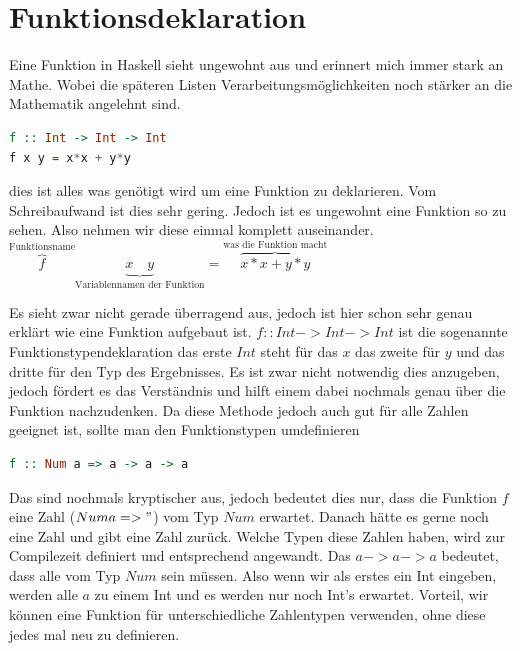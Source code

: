 \section{Funktionsdeklaration}
Eine Funktion in Haskell sieht ungewohnt aus und erinnert mich immer stark an Mathe. Wobei die späteren Listen Verarbeitungsmöglichkeiten noch stärker an die Mathematik angelehnt sind.
\newline
\begin{lstlisting}[language=Haskell]  
f :: Int -> Int -> Int
f x y = x*x + y*y
\end{lstlisting}
\qquad\newline
dies ist alles was genötigt wird um eine Funktion zu deklarieren. Vom Schreibaufwand ist dies sehr gering. Jedoch ist es ungewohnt eine Funktion so zu sehen. Also nehmen wir diese einmal komplett auseinander. 
\qquad\newline\qquad\newline
$\overbrace{f}^\text{Funktionsname} \underbrace{x \quad y}_\text{Variablennamen der Funktion} = \overbrace{x*x+y*y}^\text{was die Funktion macht}$
\qquad\newline\qquad\newline

Es sieht zwar nicht gerade überragend aus, jedoch ist hier schon sehr genau erklärt wie eine Funktion aufgebaut ist. 
$f :: Int -> Int -> Int$ ist die sogenannte Funktionstypendeklaration das erste $Int$ steht für das $x$ das zweite für $y$ und das dritte für den Typ des Ergebnisses. Es ist zwar nicht notwendig dies anzugeben, jedoch fördert es das Verständnis und hilft einem dabei nochmals genau über die Funktion nachzudenken. Da diese Methode jedoch auch gut für alle Zahlen geeignet ist, sollte man den Funktionstypen umdefinieren
\newline
\begin{lstlisting}[language=Haskell]  
f :: Num a => a -> a -> a 
\end{lstlisting}
\qquad\newline
Das sind nochmals kryptischer aus, jedoch bedeutet dies nur, dass die Funktion $f$ eine Zahl ($Num a =>"$) vom Typ $Num$ erwartet. Danach hätte es gerne noch eine Zahl und gibt eine Zahl zurück. Welche Typen diese Zahlen haben, wird zur Compilezeit definiert und entsprechend angewandt. Das $a->a->a$ bedeutet, dass alle vom Typ $Num$ sein müssen. Also wenn wir als erstes ein Int eingeben, werden alle $a$ zu einem Int und es werden nur noch Int's erwartet. Vorteil, wir können eine Funktion für unterschiedliche Zahlentypen verwenden, ohne diese jedes mal neu zu definieren. 

